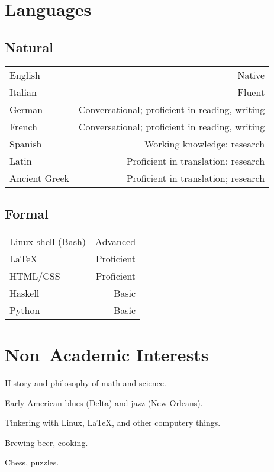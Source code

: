 \documentclass[letterpaper]{article}
\makeatletter
\newcommand{\myvrule}{\color{lightgray}\vrule width 1.0pt}
\newenvironment{cvsection}{%
  \vspace{-3ex}
  \renewcommand{\arraystretch}{1.5}
  \begin{longtable}{@{} L R @{}}
}{%
  \end{longtable}
  \vspace{1ex}
  \renewcommand{\arraystretch}{1.0}
}
\makeatother
\begin{document}
\section*{Languages}

\subsection*{Natural}

\begin{cvsection}
  English & Native \\
  Italian & Fluent \\
  German & Conversational; proficient in reading, writing \\
  French & Conversational; proficient in reading, writing \\
  Spanish & Working knowledge; research \\
  Latin & Proficient in translation; research \\
  Ancient Greek & Proficient in translation; research \\
\end{cvsection}

\subsection*{Formal}

\begin{cvsection}
  Linux shell {\footnotesize (Bash)} & Advanced \\
  \LaTeX{} & Proficient \\
  HTML/CSS & Proficient \\
  Haskell & Basic \\
  Python & Basic
\end{cvsection}



\section*{Non--Academic Interests}

\begin{list}{}{\leftmargin=0pt}
  \item History and philosophy of math and science.
  \item Early American blues (Delta) and jazz (New Orleans).
  \item Tinkering with Linux, \LaTeX{}, and other computery things.
  \item Brewing beer, cooking.
  \item Chess, puzzles.
\end{list}
\end{document}
